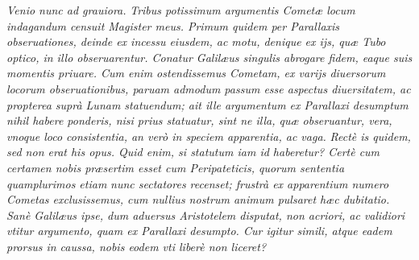 \documentclass[11pt,twoside,openany]{book}
\begin{document}
\par\bigskip\noindent{}\enspace \textit{Venio nunc ad grauiora. }\textit{Tribus potissimum argumentis Cometæ locum indagandum censuit Magister meus. Primum quidem per Parallaxis obseruationes, deinde ex incessu eiusdem, ac motu, denique ex ijs, quæ Tubo optico, in illo obseruarentur. Conatur Galilæus singulis abrogare fidem, eaque suis momentis priuare. Cum enim ostendissemus Cometam, ex varijs diuersorum locorum obseruationibus, paruam admodum passum esse aspectus diuersitatem, ac propterea suprà Lunam statuendum; ait ille argumentum ex Parallaxi desumptum nihil habere ponderis, nisi prius statuatur, sint ne illa, quæ obseruantur, vera, vnoque loco consistentia, an verò in speciem apparentia, ac vaga. }\textit{Rectè is quidem, sed non erat his opus. Quid enim, si statutum iam id haberetur? Certè cum certamen nobis præsertim esset cum Peripateticis, quorum sententia quamplurimos etiam }\textit{nunc sectatores recenset; frustrà ex apparentium numero Cometas exclusissemus, cum nullius nostrum animum pulsaret hæc dubitatio. Sanè Galilæus ipse, dum aduersus Aristotelem disputat, non acriori, ac validiori vtitur argumento, quam ex Parallaxi desumpto. Cur igitur simili, atque eadem prorsus in caussa, nobis eodem vti liberè non liceret?}
\end{document}
